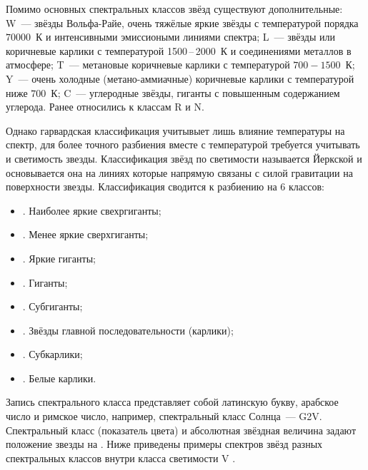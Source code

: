 Помимо основных спектральных классов звёзд существуют дополнительные: W~--- звёзды Вольфа-Райе, очень тяжёлые яркие звёзды с температурой порядка $70000$~К и интенсивными эмиссиоными линиями спектра; L~--- звёзды или коричневые карлики с температурой 1500\,--\,2000~К и соединениями металлов в атмосфере; T~--- метановые коричневые карлики с температурой $700 - 1500$~К; Y~---  очень холодные (метано-аммиачные) коричневые карлики с температурой ниже $700$~К; C~--- углеродные звёзды, гиганты с повышенным содержанием углерода. Ранее относились к классам R и N.

Однако гарвардская классификация учитывыет лишь влияние температуры на спектр, для более точного разбиения вместе с температурой требуется учитывать и светимость звезды. Классификация звёзд по светимости называется Йеркской и основывается она на линиях которые напрямую связаны с силой гравитации на поверхности звезды. Классификация сводится к разбиению на 6 классов:
\begin{itemize}
	\item {}. Наиболее яркие свехргиганты;
	\item {}. Менее яркие сверхгиганты;
	\item {}. Яркие гиганты;
	\item {}. Гиганты;
	\item {}. Субгиганты;
	\item {}. Звёзды главной последовательности (карлики);
	\item {}. Субкарлики;
	\item {}. Белые карлики.
\end{itemize}
Запись спектрального класса представляет собой латинскую букву, арабское число и римское число, например, спектральный класс Солнца~--- G2V. Спектральный класс (показатель цвета) и абсолютная звёздная величина задают положение звезды на . Ниже приведены примеры спектров звёзд разных спектральных классов внутри класса светимости V .
